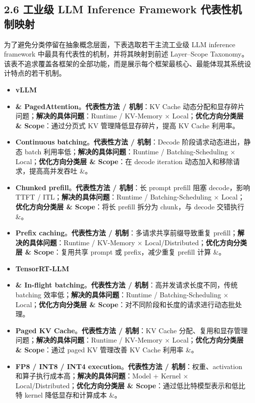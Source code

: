 \documentclass[a4paper,twocolumn,10pt]{ctexart}
\begin{document}
\subsection{2.6 工业级 LLM Inference Framework 代表性机制映射}

为了避免分类停留在抽象概念层面，下表选取若干主流工业级 LLM inference framework 中最具有代表性的机制，并将其映射到前述 Layer–Scope Taxonomy。该表不追求覆盖各框架的全部功能，而是展示每个框架最核心、最能体现其系统设计特点的若干机制。



\begin{itemize}
\item \textbf{vLLM}
\item \textbf{\& PagedAttention}。\textbf{代表性方法 / 机制}：KV Cache 动态分配和显存碎片问题；\textbf{解决的具体问题}：Runtime / KV-Memory × Local；\textbf{优化方向分类层 \& Scope}：通过分页式 KV 管理降低显存碎片，提高 KV Cache 利用率。
\item \textbf{Continuous batching}。\textbf{代表性方法 / 机制}：Decode 阶段请求动态进出，静态 batch 利用率低；\textbf{解决的具体问题}：Runtime / Batching-Scheduling × Local；\textbf{优化方向分类层 \& Scope}：在 decode iteration 动态加入和移除请求，提高高并发吞吐 \&。
\item \textbf{Chunked prefill}。\textbf{代表性方法 / 机制}：长 prompt prefill 阻塞 decode，影响 TTFT / ITL；\textbf{解决的具体问题}：Runtime / Batching-Scheduling × Local；\textbf{优化方向分类层 \& Scope}：将长 prefill 拆分为 chunk，与 decode 交错执行 \&。
\item \textbf{Prefix caching}。\textbf{代表性方法 / 机制}：多请求共享前缀导致重复 prefill；\textbf{解决的具体问题}：Runtime / KV-Memory × Local/Distributed；\textbf{优化方向分类层 \& Scope}：复用共享 prompt 或 prefix，减少重复 prefill 计算 \&。
\item \textbf{TensorRT-LLM}
\item \textbf{\& In-flight batching}。\textbf{代表性方法 / 机制}：高并发请求长度不同，传统 batching 效率低；\textbf{解决的具体问题}：Runtime / Batching-Scheduling × Local；\textbf{优化方向分类层 \& Scope}：对不同阶段和长度的请求进行动态批处理。
\item \textbf{Paged KV Cache}。\textbf{代表性方法 / 机制}：KV Cache 分配、复用和显存管理问题；\textbf{解决的具体问题}：Runtime / KV-Memory × Local；\textbf{优化方向分类层 \& Scope}：通过 paged KV 管理改善 KV Cache 利用率 \&。
\item \textbf{FP8 / INT8 / INT4 execution}。\textbf{代表性方法 / 机制}：权重、activation 和算子执行成本高；\textbf{解决的具体问题}：Model + Kernel × Local/Distributed；\textbf{优化方向分类层 \& Scope}：通过低比特模型表示和低比特 kernel 降低显存和计算成本 \&。

\end{itemize}
\end{document}
